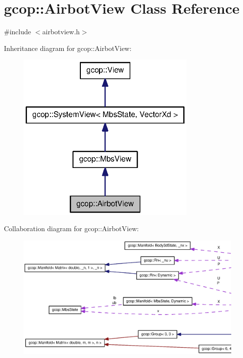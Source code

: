 \section{gcop\-:\-:\-Airbot\-View \-Class \-Reference}
\label{classgcop_1_1AirbotView}


{\ttfamily \#include $<$airbotview.\-h$>$}



\-Inheritance diagram for gcop\-:\-:\-Airbot\-View\-:
\nopagebreak
\begin{figure}[H]
\begin{center}
\leavevmode
\includegraphics[width=250pt]{classgcop_1_1AirbotView__inherit__graph}
\end{center}
\end{figure}


\-Collaboration diagram for gcop\-:\-:\-Airbot\-View\-:
\nopagebreak
\begin{figure}[H]
\begin{center}
\leavevmode
\includegraphics[width=350pt]{classgcop_1_1AirbotView__coll__graph}
\end{center}
\end{figure}
